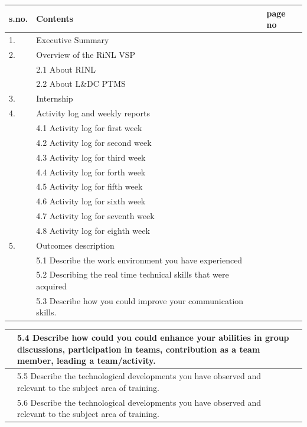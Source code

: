 \documentclass{article} %
\begin{document}
\begin{tabular}{|p{0.5in}|p{3.1in}|p{0.8in}|} \hline 
s.no. & Contents & page no \\ \hline 
1. & Executive Summary &  \\ \hline 
2. & Overview of the RiNL VSP &  \\ \hline 
 & 2.1 About RINL &  \\ \hline 
 & 2.2 About L\&DC PTMS &  \\ \hline 
3. & Internship &  \\ \hline 
4. & Activity log and weekly reports &  \\ \hline 
 & 4.1 Activity log for first week &  \\ \hline 
 & 4.2 Activity log for second week &  \\ \hline 
 & 4.3 Activity log for third week &  \\ \hline 
 & 4.4 Activity log for forth week &  \\ \hline 
 & 4.5 Activity log for fifth week &  \\ \hline 
 & 4.6 Activity log for sixth week &  \\ \hline 
 & 4.7 Activity log for seventh week &  \\ \hline 
 & 4.8 Activity log for eighth week &  \\ \hline 
5. & Outcomes description &  \\ \hline 
 & 5.1 Describe the work environment you have experienced &  \\ \hline 
 & 5.2 Describing the real time technical skills that were acquired &  \\ \hline 
 & 5.3 Describe how you could improve your communication skills. &  \\ \hline 
\end{tabular}



\begin{tabular}{|p{0.7in}|p{2.8in}|p{0.8in}|} \hline 
 & 5.4 Describe how could you could enhance your abilities in group discussions, participation in teams, contribution as a team member, leading a team/activity. &  \\ \hline 
 & 5.5 Describe the technological developments you have observed and relevant to the subject area of training. &  \\ \hline 
 & 5.6 Describe the technological developments you have observed and relevant to the subject area of training. &  \\ \hline 
\end{tabular}
\end{document}
